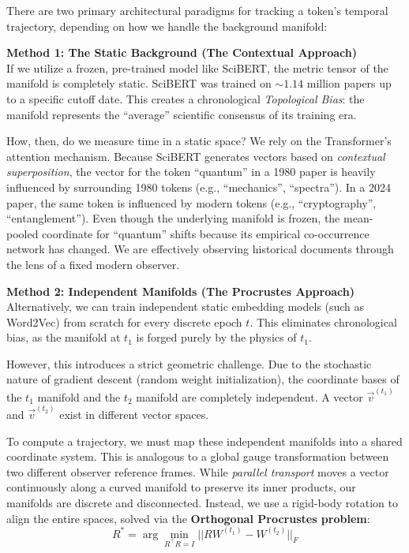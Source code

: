 There are two primary architectural paradigms for tracking a token's temporal trajectory, depending on how we handle the background manifold:

\textbf{Method 1: The Static Background (The Contextual Approach)} \\
If we utilize a frozen, pre-trained model like SciBERT, the metric tensor of the manifold is completely static. SciBERT was trained on $\sim 1.14$ million papers up to a specific cutoff date. This creates a chronological \textit{Topological Bias}: the manifold represents the ``average'' scientific consensus of its training era.

How, then, do we measure time in a static space? We rely on the Transformer's attention mechanism. Because SciBERT generates vectors based on \textit{contextual superposition}, the vector for the token ``quantum'' in a 1980 paper is heavily influenced by surrounding 1980 tokens (e.g., ``mechanics'', ``spectra''). In a 2024 paper, the same token is influenced by modern tokens (e.g., ``cryptography'', ``entanglement''). Even though the underlying manifold is frozen, the mean-pooled coordinate for ``quantum'' shifts because its empirical co-occurrence network has changed. We are effectively observing historical documents through the lens of a fixed modern observer.

\textbf{Method 2: Independent Manifolds (The Procrustes Approach)} \\
Alternatively, we can train independent static embedding models (such as Word2Vec) from scratch for every discrete epoch $t$. This eliminates chronological bias, as the manifold at $t_1$ is forged purely by the physics of $t_1$.

However, this introduces a strict geometric challenge. Due to the stochastic nature of gradient descent (random weight initialization), the coordinate bases of the $t_1$ manifold and the $t_2$ manifold are completely independent. A vector $\vec{v}^{(t_1)}$ and $\vec{v}^{(t_2)}$ exist in different vector spaces.

To compute a trajectory, we must map these independent manifolds into a shared coordinate system. This is analogous to a global gauge transformation between two different observer reference frames. While \textit{parallel transport} moves a vector continuously along a curved manifold to preserve its inner products, our manifolds are discrete and disconnected. Instead, we use a rigid-body rotation to align the entire spaces, solved via the \textbf{Orthogonal Procrustes problem}:
\begin{equation}
    R^* = \arg\min_{R^\top R = I} ||RW^{(t_1)} - W^{(t_2)}||_F
\end{equation}


